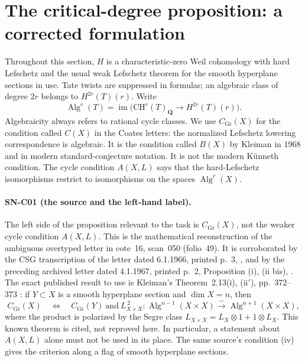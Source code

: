 \section{The critical-degree proposition: a corrected formulation}
\label{sec:critical-proposition}

Throughout this section, $H$ is a characteristic-zero Weil cohomology
with hard Lefschetz and the usual weak Lefschetz theorem for the smooth
hyperplane sections in use.  Tate twists are suppressed in formulas; an
algebraic class of degree $2r$ belongs to $H^{2r}(T)(r)$.
Write
\[
 \operatorname{Alg}^r(T)=\operatorname{im}\bigl(
 \mathrm{CH}^r(T)_{\mathbf Q}\longrightarrow H^{2r}(T)(r)\bigr).
\]
Algebraicity always refers to rational cycle classes.  We use
$C_{\mathrm{Gr}}(X)$ for the condition called $C(X)$ in the Coates
letters: the normalized Lefschetz lowering correspondence is algebraic.
It is the condition called $B(X)$ by Kleiman in 1968 and in modern
standard-conjecture notation.  It is not the modern K\"unneth condition.
The cycle condition $A(X,L)$ says that the hard-Lefschetz isomorphisms
restrict to isomorphisms on the spaces $\operatorname{Alg}^r(X)$.

\paragraph{SN-C01 (the source and the left-hand label).}
The left side of the proposition relevant to the task is
$C_{\mathrm{Gr}}(X)$, not the weaker cycle condition $A(X,L)$.
This is the mathematical reconstruction of the ambiguous overtyped
letter in cote~16, scan~050 (folio~49).  It is corroborated by the
CSG transcription of the letter dated 6.1.1966, printed p.~3,
\cite{GrothCoates1966}, and by the preceding archived letter dated 4.1.1967,
printed p.~2, Proposition (i), (ii bis), \cite{GrothCoates1967}.
The exact published result to use is Kleiman's Theorem~2.13(i),
(ii$'$), pp.~372--373 \cite{Kleiman1968}: if $Y\subset X$ is a
smooth hyperplane section and $\dim X=n$, then
\begin{equation}
 C_{\mathrm{Gr}}(X)\quad\Longleftrightarrow\quad
 C_{\mathrm{Gr}}(Y)\ \text{and}\
 L_{X\times X}^{\,2}:
 \operatorname{Alg}^{n-1}(X\times X)
 \xrightarrow{\ \sim\ }
 \operatorname{Alg}^{n+1}(X\times X),
 \label{eq:kleiman-critical}
\end{equation}
where the product is polarized by the Segre class
$L_{X\times X}=L_X\otimes1+1\otimes L_X$.
This known theorem is cited, not reproved here.  In particular,
a statement about $A(X,L)$ alone must not be used in its place.
The same source's condition (iv) gives the criterion along a flag
of smooth hyperplane sections.

